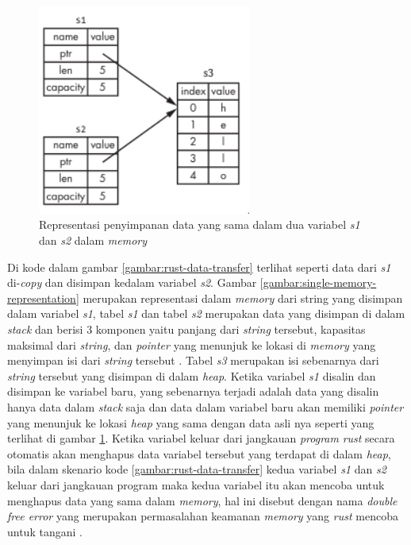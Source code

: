 \begin{figure}[H]
  \centering
	\includegraphics[keepaspectratio, width=7cm]{gambar/double-s1-s2-memory.png}
  \caption{Representasi penyimpanan data yang sama dalam dua variabel \emph{s1} dan \emph{s2} dalam \emph{memory} \citep{rustbook}}
	\label{gambar:double-memory-representation}
\end{figure}

Di kode dalam gambar \ref{gambar:rust-data-transfer} terlihat seperti data dari \emph{s1} di-\emph{copy} dan disimpan kedalam variabel \emph{s2}. Gambar \ref{gambar:single-memory-representation} merupakan representasi dalam \emph{memory} dari string yang disimpan dalam variabel \emph{s1}, tabel \emph{s1} dan tabel \emph{s2} merupakan data yang disimpan di dalam \emph{stack} dan berisi 3 komponen yaitu panjang dari \emph{string} tersebut, kapasitas maksimal dari \emph{string}, dan \emph{pointer} yang menunjuk ke lokasi di \emph{memory} yang menyimpan isi dari \emph{string} tersebut \citep{rustbook}. Tabel \emph{s3} merupakan isi sebenarnya dari \emph{string} tersebut yang disimpan di dalam \emph{heap}. Ketika variabel \emph{s1} disalin dan disimpan ke variabel baru, yang sebenarnya terjadi adalah data yang disalin hanya data dalam \emph{stack} saja dan data dalam variabel baru akan memiliki \emph{pointer} yang menunjuk ke lokasi \emph{heap} yang sama dengan data asli nya seperti yang terlihat di gambar \ref{gambar:double-memory-representation}. Ketika variabel keluar dari jangkauan \emph{program} \emph{rust} secara otomatis akan menghapus data variabel tersebut yang terdapat di dalam \emph{heap}, bila dalam skenario kode \ref{gambar:rust-data-transfer} kedua variabel \emph{s1} dan \emph{s2} keluar dari jangkauan program maka kedua variabel itu akan mencoba untuk menghapus data yang sama dalam \emph{memory}, hal ini disebut dengan nama \emph{double free error} yang merupakan permasalahan keamanan \emph{memory} yang \emph{rust} mencoba untuk tangani \citep{rustbook}.

